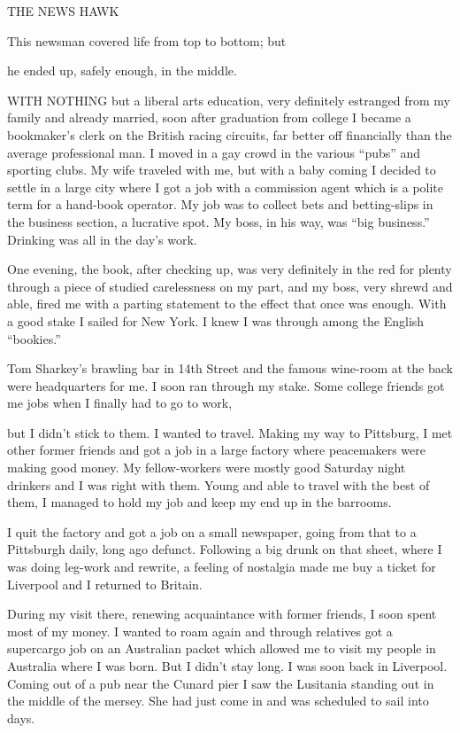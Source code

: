 
THE NEWS HAWK

This newsman covered life from top to bottom; but

he ended up, safely enough, in the middle.

 

      WITH NOTHING but a liberal arts education, very definitely estranged from my family and already married, soon after graduation from college I became a bookmaker’s clerk on the British racing circuits, far better off financially than the average professional man. I moved in a gay crowd in the various “pubs” and sporting clubs. My wife traveled with me, but with a baby coming I decided to settle in a large city where I got a job with a commission agent which is a polite term for a hand-book operator. My job was to collect bets and betting-slips in the business section, a lucrative spot. My boss, in his way, was “big business.” Drinking was all in the day’s work.

One evening, the book, after checking up, was very definitely in the red for plenty through a piece of studied carelessness on my part, and my boss, very shrewd and able, fired me with a parting statement to the effect that once was enough. With a good stake I sailed for New York. I knew I was through among the English “bookies.”

Tom Sharkey’s brawling bar in 14th Street and the famous wine-room at the back were headquarters for me. I soon ran through my stake. Some college friends got me jobs when I finally had to go to work,

but I didn’t stick to them. I wanted to travel. Making my way to Pittsburg, I met other former friends and got a job in a large factory where peacemakers were making good money. My fellow-workers were mostly good Saturday night drinkers and I was right with them. Young and able to travel with the best of them, I managed to hold my job and keep my end up in the barrooms.

I quit the factory and got a job on a small newspaper, going from that to a Pittsburgh daily, long ago defunct. Following a big drunk on that sheet, where I was doing leg-work and rewrite, a feeling of nostalgia made me buy a ticket for Liverpool and I returned to Britain.

During my visit there, renewing acquaintance with former friends, I soon spent most of my money. I wanted to roam again and through relatives got a supercargo job on an Australian packet which allowed me to visit my people in Australia where I was born. But I didn’t stay long. I was soon back in Liverpool. Coming out of a pub near the Cunard pier I saw the Lusitania standing out in the middle of the mersey. She had just come in and was scheduled to sail into days.

